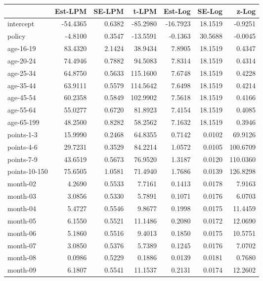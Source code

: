 \documentclass[10pt]{article}
\begin{document}
\begin{table}[ht]
\centering
\begin{tabular}{lrrrrrr}
  \hline
 & Est-LPM & SE-LPM & t-LPM & Est-Log & SE-Log & z-Log \\ 
  \hline
intercept & -54.4365 & 0.6382 & -85.2980 & -16.7923 & 18.1519 & -0.9251 \\ 
  policy & -4.8100 & 0.3547 & -13.5591 & -0.1363 & 30.5688 & -0.0045 \\ 
  age-16-19 & 83.4320 & 2.1424 & 38.9434 & 7.8905 & 18.1519 & 0.4347 \\ 
  age-20-24 & 74.4946 & 0.7882 & 94.5083 & 7.8314 & 18.1519 & 0.4314 \\ 
  age-25-34 & 64.8750 & 0.5633 & 115.1600 & 7.6748 & 18.1519 & 0.4228 \\ 
  age-35-44 & 63.9111 & 0.5579 & 114.5642 & 7.6498 & 18.1519 & 0.4214 \\ 
  age-45-54 & 60.2358 & 0.5849 & 102.9902 & 7.5618 & 18.1519 & 0.4166 \\ 
  age-55-64 & 55.0277 & 0.6720 & 81.8923 & 7.4154 & 18.1519 & 0.4085 \\ 
  age-65-199 & 48.2500 & 0.8282 & 58.2562 & 7.1632 & 18.1519 & 0.3946 \\ 
  points-1-3 & 15.9990 & 0.2468 & 64.8355 & 0.7142 & 0.0102 & 69.9126 \\ 
  points-4-6 & 29.7231 & 0.3529 & 84.2214 & 1.0572 & 0.0105 & 100.6709 \\ 
  points-7-9 & 43.6519 & 0.5673 & 76.9520 & 1.3187 & 0.0120 & 110.0360 \\ 
  points-10-150 & 75.6505 & 1.0581 & 71.4940 & 1.7686 & 0.0139 & 126.8298 \\ 
  month-02 & 4.2690 & 0.5533 & 7.7161 & 0.1413 & 0.0178 & 7.9163 \\ 
  month-03 & 3.0856 & 0.5330 & 5.7891 & 0.1071 & 0.0176 & 6.0703 \\ 
  month-04 & 5.4727 & 0.5546 & 9.8677 & 0.1998 & 0.0175 & 11.4459 \\ 
  month-05 & 6.1550 & 0.5521 & 11.1486 & 0.2080 & 0.0172 & 12.0690 \\ 
  month-06 & 5.1860 & 0.5516 & 9.4013 & 0.1850 & 0.0175 & 10.5751 \\ 
  month-07 & 3.0850 & 0.5376 & 5.7389 & 0.1245 & 0.0176 & 7.0702 \\ 
  month-08 & 0.0986 & 0.5229 & 0.1886 & 0.0139 & 0.0181 & 0.7680 \\ 
  month-09 & 6.1807 & 0.5541 & 11.1537 & 0.2131 & 0.0174 & 12.2602 \\ 

\end{tabular}
\end{table}
\end{document}
